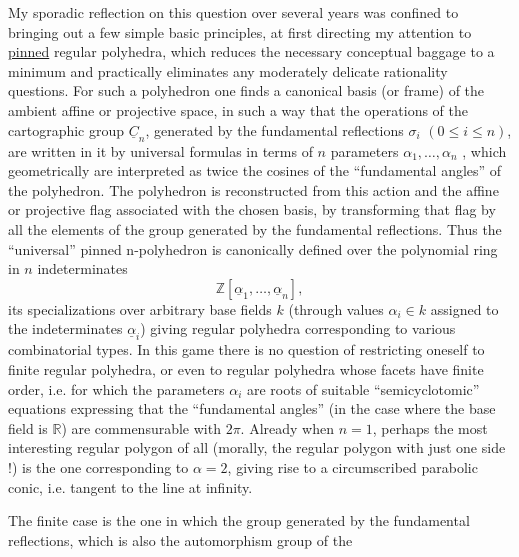 
My sporadic reflection on this question over several years
was confined to bringing out a few simple basic principles, at
first directing my attention to \uline{pinned} regular
polyhedra,
which reduces the necessary conceptual baggage to a minimum
and practically eliminates any moderately delicate rationality
questions. For such a polyhedron one finds a canonical basis (or
frame) of the ambient affine or projective space, in
such a way that the operations of the cartographic group $\underline{C}_n$, generated
by the fundamental reflections $\sigma_i$ $(0 \leq i \leq n)$, are written in it
by universal formulas in terms of $n$ parameters
$\alpha_1,\ldots,\alpha_n$ , which geometrically are interpreted as twice
the cosines of the ``fundamental angles'' of the polyhedron. The polyhedron
is reconstructed from this action and the affine or
projective flag associated with the chosen basis, by transforming that flag
by all the elements of the group generated by the fundamental
reflections. Thus the ``universal'' pinned n-polyhedron is
canonically defined over the polynomial ring in $n$ indeterminates
\[ \mathbb{Z}[\underline{\alpha}_1,\ldots,\underline{\alpha}_n] , \]
its specializations over arbitrary base fields $k$ (through
values $\alpha_i \in k$ assigned to the indeterminates $\underline{\alpha}_i$) giving
regular polyhedra corresponding to various combinatorial
types. In this game there is no question of restricting oneself to
finite regular polyhedra, or even to regular polyhedra whose
facets have finite order, i.e. for which the parameters
$\alpha_i$ are roots of suitable ``semicyclotomic'' equations
expressing that the ``fundamental angles'' (in the
case where the base field is $\mathbb{R}$) are commensurable with $2\pi$. Already
when $n = 1$, perhaps the most interesting regular polygon
of all (morally, the regular polygon with just one side !)
is the one corresponding to $\alpha = 2$, giving rise to a circumscribed
parabolic conic, i.e. tangent to the line at infinity.

The finite case is the one in which the group generated by the fundamental
reflections, which is also the automorphism group of the


